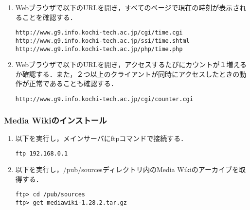 \documentclass[a4j,titlepage]{jarticle}
\begin{document}
\begin{itemize}
\begin{enumerate}
\item Webブラウザで以下のURLを開き，すべてのページで現在の時刻が表示されることを確認する．
\begin{screen}
\begin{center}
\begin{verbatim}
http://www.g9.info.kochi-tech.ac.jp/cgi/time.cgi
http://www.g9.info.kochi-tech.ac.jp/ssi/time.shtml
http://www.g9.info.kochi-tech.ac.jp/php/time.php
\end{verbatim}
\end{center}
\end{screen}

\item Webブラウザで以下のURLを開き，アクセスするたびにカウントが１増えるか確認する．また，２つ以上のクライアントが同時にアクセスしたときの動作が正常であることも確認する．
\begin{screen}
\begin{center}
\begin{verbatim}
http://www.g9.info.kochi-tech.ac.jp/cgi/counter.cgi
\end{verbatim}
\end{center}
\end{screen}

\end{enumerate}

\subsubsection{Media Wikiのインストール}
\begin{enumerate}
\item 以下を実行し，メインサーバにftpコマンドで接続する．
\begin{screen}
\begin{center}
\begin{verbatim}
ftp 192.168.0.1
\end{verbatim}
\end{center}
\end{screen}

\item 以下を実行し，/pub/sourcesディレクトリ内のMedia Wikiのアーカイブを取得する．
\begin{screen}
\begin{center}
\begin{verbatim}
ftp> cd /pub/sources
ftp> get mediawiki-1.28.2.tar.gz
\end{verbatim}
\end{center}
\end{screen}


\end{enumerate}
\end{itemize}
\end{document}
